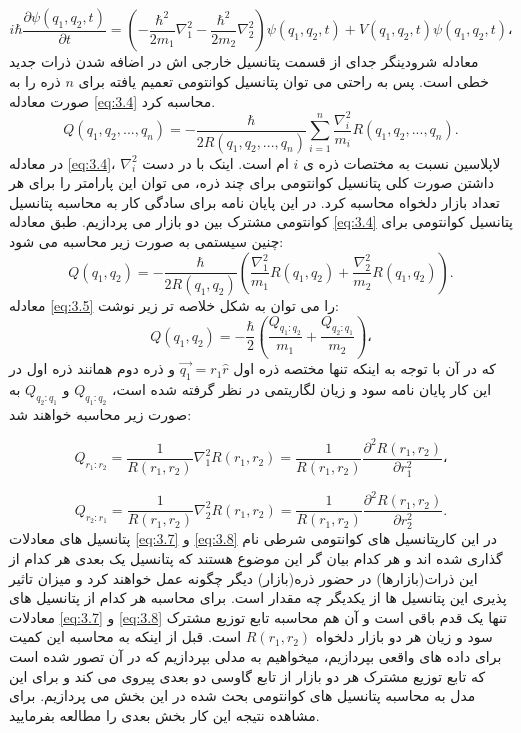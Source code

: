 \documentclass[a4paper,titlepage,12pt,fleqn,oneside]{report}
\begin{document}
 \begin{equation}
 i \hbar \frac{\partial\psi(q_1,q_2,t)}{\partial t} =\left(-\frac{\hbar^2}{2m_1}{\nabla_1^2}-\frac{\hbar^2}{2m_2}{\nabla_2^2} \right)\psi(q_1,q_2,t)+V(q_1,q_2,t)\psi(q_1,q_2,t) ،
 \label{eq:3.3}
 \end{equation}
 معادله شرودینگر جدای از قسمت پتانسیل خارجی اش در اضافه شدن ذرات جدید خطی است. پس به راحتی می توان پتانسیل کوانتومی تعمیم یافته برای $n$ ذره را به صورت معادله
 \ref{eq:3.4}
 محاسبه کرد.
\begin{equation}
Q(q_{1},q_{2},...,q_{n})=-\frac{\hbar}{2R(q_{1},q_{2},...,q_{n})}\sum
_{i=1}^{n}\frac{\nabla_i^2}{m_{i}}R(q_{1}
,q_{2},...,q_{n}).
 \label{eq:3.4}
\end{equation}
در معادله 
\ref{eq:3.4}،
$\nabla_i^2$
لاپلاسین نسبت به مختصات ذره ی $i$ ام است.
اینک با در دست داشتن صورت کلی پتانسیل کوانتومی برای چند ذره، می توان این پارامتر را برای هر تعداد بازار دلخواه محاسبه کرد. در این پایان نامه برای سادگی کار به محاسبه پتانسیل کوانتومی مشترک بین دو بازار می پردازیم. طبق معادله
\ref{eq:3.4}
پتانسیل کوانتومی برای چنین سیستمی به صورت زیر محاسبه می شود:
\begin{equation}
Q(q_{1},q_{2})=-\frac{\hbar}{2R(q_{1},q_{2})}\left(\frac{\nabla_1^2}{m_{1}}R(q_{1}
,q_{2}) + \frac{\nabla_2^2}{m_{2}}R(q_{1},q_{2})\right).
\label{eq:3.5}
\end{equation}
معادله
\ref{eq:3.5}
را می توان به شکل خلاصه تر زیر نوشت:
\begin{equation}
Q(q_{1},q_{2})=-\frac{\hbar}{2}\left(\frac{Q_{q_1:q_2}}{m_{1}} + \frac{Q_{q_2:q_1}}{m_{2}}\right)،
\label{eq:3.6}
\end{equation}
که در آن با توجه به اینکه تنها مختصه ذره اول
 $\vec{q_1} = r_1\hat{r}$ 
 و ذره دوم همانند ذره اول در این کار پایان نامه سود و زیان لگاریتمی در نظر گرفته شده است، 
 $Q_{q_1:q_2}$
 و
 $Q_{q_2:q_1}$
 به صورت زیر محاسبه خواهند شد:

\begin{equation}
Q_{r_1:r_2} =\frac{1}{R(r_1,r_2)} \nabla_1^2 R(r_{1},r_{2} ) =\frac{1}{R(r_1,r_2)} \frac{\partial^2 R(r_1,r_2)}{\partial r_1^2}،
\label{eq:3.7}
\end{equation}

\begin{equation}
Q_{r_2:r_1} =\frac{1}{R(r_1,r_2)} \nabla_2^2 R(r_{1},r_{2} ) =\frac{1}{R(r_1,r_2)} \frac{\partial^2 R(r_1,r_2)}{\partial r_2^2}.
\label{eq:3.8}
\end{equation}
پتانسیل های معادلات 
\ref{eq:3.7}
و
\ref{eq:3.8}
 در این کارپتانسیل های کوانتومی شرطی نام گذاری شده اند و هر کدام بیان گر این موضوع هستند که پتانسیل یک بعدی هر کدام از این ذرات(بازارها) در حضور ذره(بازار) دیگر چگونه عمل خواهند کرد و میزان تاثیر پذیری این پتانسیل ها از یکدیگر چه مقدار است.
برای محاسبه هر کدام از پتانسیل های معادلات 
\ref{eq:3.7}
و
\ref{eq:3.8}
تنها یک قدم باقی است و آن هم محاسبه تابع توزیع مشترک سود و زیان هر دو بازار دلخواه
$R(r_1,r_2)$
است. قبل از اینکه به محاسبه این کمیت برای داده های واقعی بپردازیم، میخواهیم به مدلی بپردازیم که در آن تصور شده است که تابع توزیع مشترک هر دو بازار از تابع گاوسی دو بعدی پیروی می کند و برای این مدل به محاسبه پتانسیل های کوانتومی بحث شده در این بخش می پردازیم. برای مشاهده نتیجه این کار بخش بعدی را مطالعه بفرمایید.
\end{document}
